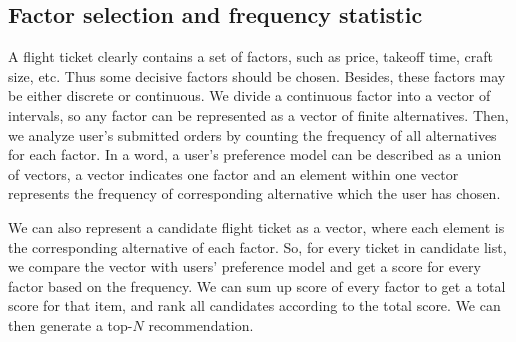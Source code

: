 \documentclass{llncs}
\begin{document}
\subsection{Factor selection and frequency statistic}
A flight ticket clearly contains a set of factors, such as price, takeoff time, craft size, etc. Thus some decisive factors should be chosen. Besides, these factors may be either discrete or continuous. We divide a continuous factor into a vector of intervals, so any factor can be represented as a vector of finite alternatives. Then, we analyze user's submitted orders by counting the frequency of all alternatives for each factor. In a word, a user's preference model can be described as a union of vectors, a vector indicates one factor and an element within one vector represents the frequency of corresponding alternative which the user has chosen.\par
We can also represent a candidate flight ticket as a vector, where each element is the corresponding alternative of each factor. So, for every ticket in candidate list, we compare the vector with users' preference model and get a score for every factor based on the frequency. We can sum up score of every factor to get a total score for that item, and rank all candidates according to the total score. We can then generate a top-$N$ recommendation.\par
\end{document}
